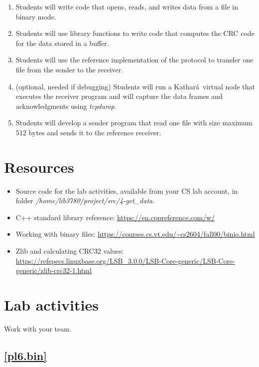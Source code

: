 \documentclass[12pt]{book}
\newcommand{\kathara}{Kathar\'a}
\begin{document}
\begin{enumerate}[label=\arabic*.]
\begin{enumerate}[label=Objective \arabic*]
\item\label{pl6.bin} Students will write code that opens, reads, and writes data from a file in binary mode.
\item\label{pl6.crc} Students will use library functions to write code that computes the CRC code for the data stored in a buffer.
\item\label{pl6.ref} Students will use the reference implementation of the protocol to transfer one file from the sender to the receiver.
\item\label{pl6.kath} (optional, needed if debugging) Students will run a \kathara\ virtual node that executes the receiver program and will capture the data frames and acknowledgments using \emph{tcpdump}.
  \item\label{pl6.send} Students will develop a sender program that read one file with size maximum 512 bytes and sends it to the reference receiver.
\end{enumerate}


\section{Resources}\label{pl6.res}
  
  \begin{itemize}[label=--]
  \item Source code for the lab activities, available from your CS lab account, in folder \emph{/home/lib3780/project/src/4-get\_data}.
  \item C++ standard library reference: \url{https://en.cppreference.com/w/}
  \item Working with binary files:
\url{https://courses.cs.vt.edu/~cs2604/fall00/binio.html}
    \item Zlib and calculating CRC32 values: \url{https://refspecs.linuxbase.org/LSB_3.0.0/LSB-Core-generic/LSB-Core-generic/zlib-crc32-1.html}
  \end{itemize}


\section{Lab activities}

Work with your team.

\subsection{\ref{pl6.bin}}\label{bin.pl6.se}


\end{enumerate}
\end{document}

